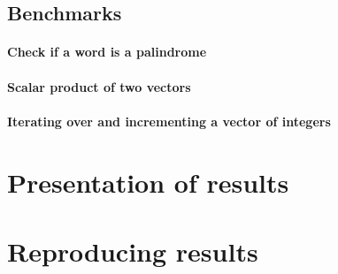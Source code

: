 \subsection{Benchmarks}

\paragraph*{Check if a word is a palindrome}

\paragraph*{Scalar product of two vectors}

\paragraph*{Iterating over and incrementing a vector of integers}

\section{Presentation of results}

\section{Reproducing results}
